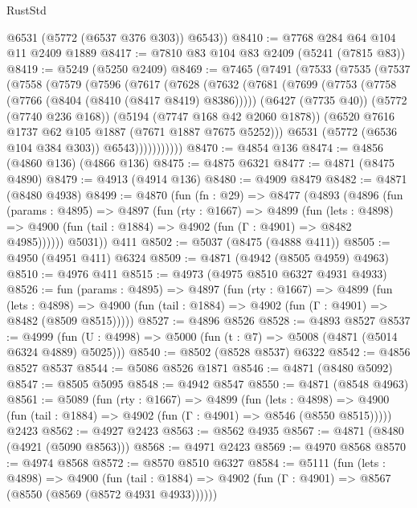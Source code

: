 \begin{lexlean}{RustStd}
\begin{coremodule}
{\begin{coremodule}
{{{{{{{{{{{{{{{{{{{{{{{{{{{{{        @6531
        (@5772 (@6537 @376 @303))
        @6543))
@8410 := @7768 @284 @64 @104 @11 @2409 @1889
@8417 := @7810 @83 @104 @83 @2409 (@5241 (@7815 @83))
@8419 := @5249 (@5250 @2409)
@8469 := @7465
    (@7491
      (@7533
        (@7535
          (@7537
            (@7558
              (@7579
                (@7596
                  (@7617
                    (@7628
                      (@7632
                        (@7681
                          (@7699
                            (@7753 (@7758 (@7766 (@8404 (@8410 (@8417 @8419) @8386)))))
                            (@6427 (@7735 @40))
                            (@5772 (@7740 @236 @168))
                            (@5194 (@7747 @168 @42 @2060 @1878))
                            (@6520 @7616 @1737 @62 @105 @1887 (@7671 @1887 @7675 @5252)))
                          @6531
                          (@5772 (@6536 @104 @384 @303))
                          @6543)))))))))))
@8470 := @4854 @136
@8474 := @4856 (@4860 @136) (@4866 @136)
@8475 := @4875 @6321
@8477 := @4871 (@8475 @4890)
@8479 := @4913 (@4914 @136)
@8480 := @4909 @8479
@8482 := @4871 (@8480 @4938)
@8499 := @4870
    (fun (fn : @29) =>
    @8477
      (@4893
        (@4896
          (fun (params : @4895) =>
          @4897
            (fun (rty : @1667) =>
            @4899
              (fun (lets : @4898) =>
              @4900 (fun (tail : @1884) => @4902 (fun (Γ : @4901) => @8482 @4985))))))
        @5031))
    @411
@8502 := @5037 (@8475 (@4888 @411))
@8505 := @4950 (@4951 @411) @6324
@8509 := @4871 (@4942 (@8505 @4959) @4963)
@8510 := @4976 @411
@8515 := @4973 (@4975 @8510 @6327 @4931 @4933)
@8526 := fun (params : @4895) =>
  @4897
    (fun (rty : @1667) =>
    @4899
      (fun (lets : @4898) =>
      @4900 (fun (tail : @1884) => @4902 (fun (Γ : @4901) => @8482 (@8509 @8515)))))
@8527 := @4896 @8526
@8528 := @4893 @8527
@8537 := @4999 (fun (U : @4998) => @5000 (fun (t : @7) => @5008 (@4871 (@5014 @6324 @4889) @5025)))
@8540 := @8502 (@8528 @8537) @6322
@8542 := @4856 @8527 @8537
@8544 := @5086 @8526 @1871
@8546 := @4871 (@8480 @5092)
@8547 := @8505 @5095
@8548 := @4942 @8547
@8550 := @4871 (@8548 @4963)
@8561 := @5089
    (fun (rty : @1667) =>
    @4899
      (fun (lets : @4898) =>
      @4900 (fun (tail : @1884) => @4902 (fun (Γ : @4901) => @8546 (@8550 @8515)))))
    @2423
@8562 := @4927 @2423
@8563 := @8562 @4935
@8567 := @4871 (@8480 (@4921 (@5090 @8563)))
@8568 := @4971 @2423
@8569 := @4970 @8568
@8570 := @4974 @8568
@8572 := @8570 @8510 @6327
@8584 := @5111
    (fun (lets : @4898) =>
    @4900
      (fun (tail : @1884) => @4902 (fun (Γ : @4901) => @8567 (@8550 (@8569 (@8572 @4931 @4933))))))
}}}}}}}}}}}}}}}}}}}}}}}}}}}}}
\end{coremodule}}
\end{coremodule}
\end{lexlean}
